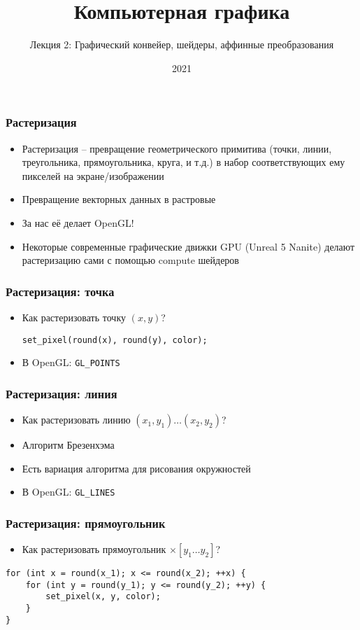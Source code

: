 \documentclass{beamer}
\title{Компьютерная графика}
\subtitle{Лекция 2: Графический конвейер, шейдеры, аффинные преобразования}
\date{2021}
\begin{document}
\frame{\titlepage}

\begin{frame}
\frametitle{Растеризация}
\begin{itemize}
\item Растеризация -- превращение геометрического примитива (точки, линии, треугольника, прямоугольника, круга, и т.д.) в набор соответствующих ему пикселей на экране/изображении
\item Превращение векторных данных в растровые
\pause
\item За нас её делает OpenGL!
\pause
\item Некоторые современные графические движки GPU (Unreal 5 Nanite) делают растеризацию сами с помощью compute шейдеров
\end{itemize}
\end{frame}

\begin{frame}[fragile]
\frametitle{Растеризация: точка}
\begin{itemize}
\item Как растеризовать точку \begin{math}(x, y)\end{math}?
\pause
\begin{verbatim}
set_pixel(round(x), round(y), color);
\end{verbatim}
\pause
\item В OpenGL: \verb|GL_POINTS|
\end{itemize}
\end{frame}

\begin{frame}[fragile]
\frametitle{Растеризация: линия}
\begin{itemize}
\item Как растеризовать линию \begin{math}(x_1, y_1) \dots (x_2, y_2)\end{math}?
\pause
\item Алгоритм Брезенхэма
\pause
\item Есть вариация алгоритма для рисования окружностей
\pause
\item В OpenGL: \verb|GL_LINES|
\end{itemize}
\end{frame}

\begin{frame}[fragile]
\frametitle{Растеризация: прямоугольник}
\begin{itemize}
\item Как растеризовать прямоугольник \begin{math}[x_1\dots x_2]\times[y_1\dots y_2]\end{math}?
\end{itemize}
\pause
\begin{verbatim}
for (int x = round(x_1); x <= round(x_2); ++x) {
    for (int y = round(y_1); y <= round(y_2); ++y) {
        set_pixel(x, y, color);
    }
}
\end{verbatim}
\end{frame}
\end{document}
